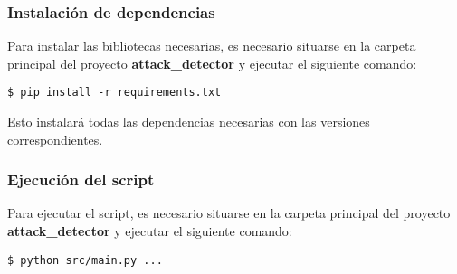 \subsubsection{Instalación de dependencias}
\label{subsubsec:InstalacionDependencias}
Para instalar las bibliotecas necesarias, es necesario situarse en la carpeta principal del proyecto \textbf{attack\_detector} y ejecutar el siguiente comando:

\begin{verbatim}
$ pip install -r requirements.txt
\end{verbatim}

Esto instalará todas las dependencias necesarias con las versiones correspondientes.

\subsubsection{Ejecución del script}
\label{subsubsec:EjecucionScript}
Para ejecutar el script, es necesario situarse en la carpeta principal del proyecto \textbf{attack\_detector} y ejecutar el siguiente comando:

\begin{verbatim}
$ python src/main.py ...
\end{verbatim}

